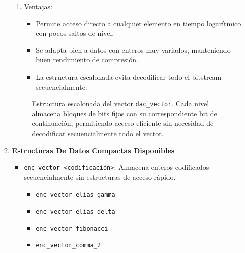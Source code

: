 \begin{enumerate}
\begin{enumerate}
\begin{enumerate}
                \item Ventajas:
                \begin{itemize}
                    \item Permite acceso directo a cualquier elemento en tiempo logarítmico con pocos saltos de nivel.
                    \item Se adapta bien a datos con enteros muy variados, manteniendo buen rendimiento de compresión.
                    \item La estructura escalonada evita decodificar todo el bitstream secuencialmente.
                \end{itemize}
            \end{enumerate}
            \begin{figure}[H]
                \centering
                \caption[Ejemplo \texttt{dac\_vector}]{Estructura escalonada del vector \texttt{dac\_vector}. Cada nivel almacena bloques de bits fijos con su correspondiente bit de continuación, permitiendo acceso eficiente sin necesidad de decodificar secuencialmente todo el vector.}
                \label{dac_vector}
            \end{figure}

            \item \textbf{Estructuras De Datos Compactas Disponibles}
            \begin{itemize}
                \item \texttt{enc\_vector\_<codificación>}:
                Almacena enteros codificados secuencialmente sin estructuras de acceso rápido.
                \begin{itemize}
                    \item \texttt{enc\_vector\_elias\_gamma}
                    \item \texttt{enc\_vector\_elias\_delta}
                    \item \texttt{enc\_vector\_fibonacci}
                    \item \texttt{enc\_vector\_comma\_2}
                \end{itemize}


\end{itemize}
\end{enumerate}
\end{enumerate}
